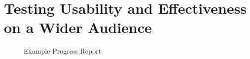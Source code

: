 \chapter{Testing Usability and Effectiveness on a Wider Audience}
\label{chap:userstudy}

\newpage
{}
\begin{figure}[hbtp]
\centering
{}
\caption[Example Progress Report]{Example Progress Report}
\label{fig:overview}
\end{figure}
\restoregeometry

